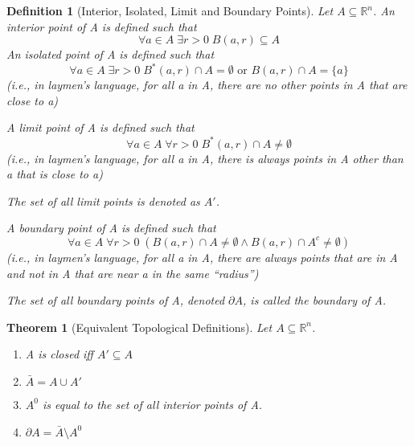 \documentclass[11pt, oneside]{book}
\theoremstyle{break}
\newtheorem{thm}{Theorem}[section]
\newtheorem{defn}{Definition}[section]
\newcommand{\bb}[1]{\mathbb{#1}}			%
\begin{document}
\begin{defn}[Interior, Isolated, Limit and Boundary Points]
	Let $A \subseteq \bb{R}^n$. An interior point of A is defined such that
	\begin{equation*}
		\forall a \in A \; \exists r > 0 \; B(a, r) \subseteq A
	\end{equation*}
	An isolated point of A is defined such that
	\begin{equation*}
		\forall a \in A \; \exists r > 0 \; B^*(a,r) \cap A = \emptyset \text{ or } B(a,r) \cap A = \{a\}
	\end{equation*}
	(i.e., in laymen's language, for all a in A, there are no other points in A that are close to a)
	
	A limit point of A is defined such that
	\begin{equation*}
		\forall a \in A \; \forall r > 0 \; B^*(a,r) \cap A \neq \emptyset
	\end{equation*}
	(i.e., in laymen's language, for all a in A, there is always points in A other than a that is close to a)

	The set of all limit points is denoted as $A'$.
	
	A boundary point of A is defined such that
	\begin{equation*}
		\forall a \in A \; \forall r > 0 \; ( B(a,r) \cap A \neq \emptyset \land B(a,r) \cap A^c \neq \emptyset)
	\end{equation*}
	(i.e., in laymen's language, for all a in A, there are always points that are in A and not in A that are near a in the same ``radius'')

	The set of all boundary points of A, denoted $\partial A$, is called the boundary of A.
\end{defn}

\begin{thm}[Equivalent Topological Definitions]\label{ETD}
	Let $A \subseteq \bb{R}^n$.
	\begin{enumerate}
		\item A is closed iff $A' \subseteq A$
		\item $\bar{A} = A \cup A'$
		\item $A^0$ is equal to the set of all interior points of A.
		\item $\partial A = \bar{A} \setminus A^0$
	\end{enumerate}
\end{thm}
\end{document}
